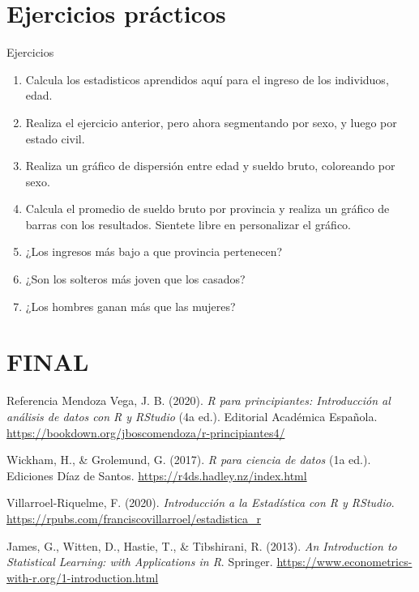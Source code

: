 \documentclass[
  ignorenonframetext,
]{beamer}
\begin{document}
\section{Ejercicios prácticos}\label{ejercicios-pruxe1cticos-1}

\begin{frame}{Ejercicios}
\label{ejercicios-2}
\begin{enumerate}
\item
  Calcula los estadisticos aprendidos aquí para el ingreso de los
  individuos, edad.
\item
  Realiza el ejercicio anterior, pero ahora segmentando por sexo, y
  luego por estado civil.
\item
  Realiza un gráfico de dispersión entre edad y sueldo bruto, coloreando
  por sexo.
\item
  Calcula el promedio de sueldo bruto por provincia y realiza un gráfico
  de barras con los resultados. Sientete libre en personalizar el
  gráfico.
\item
  ¿Los ingresos más bajo a que provincia pertenecen?
\item
  ¿Son los solteros más joven que los casados?
\item
  ¿Los hombres ganan más que las mujeres?
\end{enumerate}
\end{frame}

\section{FINAL}\label{final}

\begin{frame}{Referencia}
\label{referencia}
Mendoza Vega, J. B. (2020). \emph{R para principiantes: Introducción al
análisis de datos con R y RStudio} (4a ed.). Editorial Académica
Española. \url{https://bookdown.org/jboscomendoza/r-principiantes4/}

Wickham, H., \& Grolemund, G. (2017). \emph{R para ciencia de datos} (1a
ed.). Ediciones Díaz de Santos. \url{https://r4ds.hadley.nz/index.html}

Villarroel-Riquelme, F. (2020). \emph{Introducción a la Estadística con
R y RStudio}. \url{https://rpubs.com/franciscovillarroel/estadistica_r}

James, G., Witten, D., Hastie, T., \& Tibshirani, R. (2013). \emph{An
Introduction to Statistical Learning: with Applications in R}. Springer.
\url{https://www.econometrics-with-r.org/1-introduction.html}
\end{frame}
\end{document}
